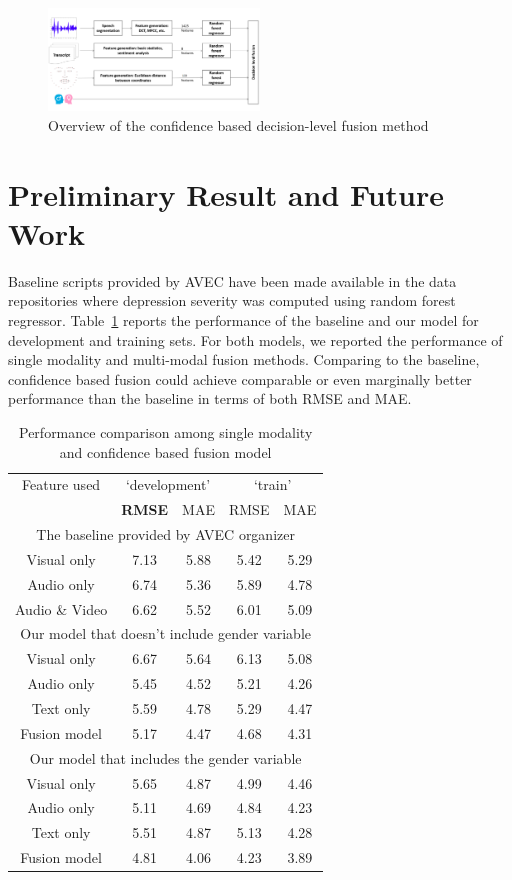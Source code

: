 \documentclass[letterpaper]{article} %
\begin{document}
\begin{figure}[ht]
\centering
\includegraphics[width=0.5\textwidth]{framework}
\caption{Overview of the confidence based decision-level fusion method}
\label{fig:framework}
\end{figure}

\section{Preliminary Result and Future Work }
Baseline scripts provided by AVEC have been made available in the data repositories where depression severity was computed using random forest regressor.
Table~\ref{tab:perf_fusion} reports the performance of the baseline and our model for development and training sets. For both models, we reported the performance of single modality and multi-modal fusion methods. Comparing to the baseline, confidence based fusion could achieve comparable or even marginally better performance than the baseline in terms of both RMSE and MAE. 


\begin{table}[thp]
\caption{Performance comparison among single modality and confidence based fusion model}
\centering
\label{tab:perf_fusion}
\begin{tabular}{  c| c c | c c }
\hline
Feature used & \multicolumn{2}{c}{`development'} & \multicolumn{2}{c}{`train'} \\
& \textbf{RMSE} & MAE & RMSE & MAE \\
\hline \hline
\multicolumn{5}{c}{The baseline provided by AVEC organizer} \\
\hline 
Visual only & 7.13 & 5.88 & 5.42 & 5.29 \\
Audio only & 6.74 & 5.36 & 5.89 & 4.78 \\
Audio \& Video & 6.62 & 5.52 & 6.01 & 5.09 \\
\hline 
\multicolumn{5}{c}{Our model that doesn't include gender variable} \\
\hline
Visual only & 6.67 & 5.64 & 6.13 & 5.08 \\
Audio only & 5.45 & 4.52 & 5.21 & 4.26 \\
Text only & 5.59 & 4.78 & 5.29 & 4.47 \\
Fusion model & 5.17 & 4.47 & 4.68 & 4.31 \\
\hline
\multicolumn{5}{c}{Our model that includes the gender variable} \\
\hline
Visual only & 5.65 & 4.87 & 4.99 & 4.46 \\
Audio only & 5.11 & 4.69 & 4.84 & 4.23 \\
Text only & 5.51 & 4.87 & 5.13 & 4.28 \\
Fusion model & 4.81 & 4.06 & 4.23 & 3.89 \\
\hline
\end{tabular}
\end{table}
\end{document}

